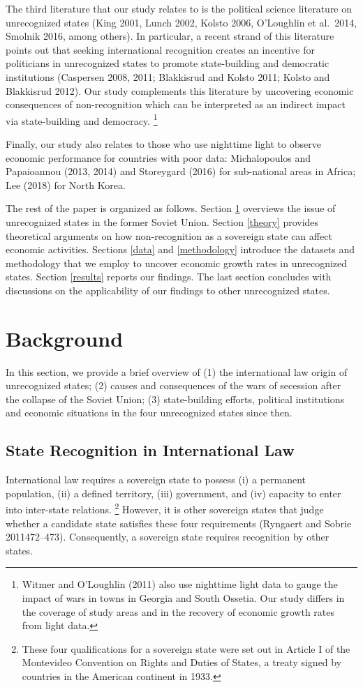\documentclass[12pt,a4paper]{article}%
\begin{document}
The third literature that our study relates to is the political science literature on unrecognized states (King 2001, Lunch 2002, Kolsto 2006, O'Loughlin et al.\ 2014, Smolnik 2016, among others). 
In particular, a recent strand of this literature points out that seeking international recognition creates an incentive for politicians in unrecognized states to promote state-building and democratic institutions (Caspersen 2008, 2011; Blakkisrud and Kolsto 2011; Kolsto and Blakkisrud 2012).
Our study complements this literature by uncovering economic consequences of non-recognition which can be interpreted as an indirect impact via state-building and democracy.%
\footnote{
	Witmer and O'Loughlin (2011) also use nighttime light data to gauge the impact of wars in towns in Georgia and South Ossetia. Our study differs in the coverage of study areas and in the recovery of economic growth rates from light data. 
} 

Finally, our study also relates to those who use nighttime light to observe economic performance for countries with poor data: Michalopoulos and Papaioannou (2013, 2014) and Storeygard (2016) for sub-national areas in Africa; Lee (2018) for North Korea. 

The rest of the paper is organized as follows. Section \ref{background} overviews the issue of unrecognized states in the former Soviet Union. Section \ref{theory} provides theoretical arguments on how non-recognition as a sovereign state can affect economic activities. Sections \ref{data} and \ref{methodology} introduce the datasets and methodology that we employ to uncover economic growth rates in unrecognized states. Section \ref{results} reports our findings. The last section concludes with discussions on the applicability of our findings to other unrecognized states.

\section{Background}\label{background}
In this section, we provide a brief overview of (1) the international law origin of unrecognized states; (2) causes and consequences of the wars of secession after the collapse of the Soviet Union; (3) state-building efforts, political institutions and economic situations in the four unrecognized states since then.
\subsection{State Recognition in International Law}\label{intl_law}
International law requires a sovereign state to possess (i) a permanent population, (ii) a defined territory, (iii) government, and (iv) capacity to enter into inter-state relations.%
\footnote{
	These four qualifications for a sovereign state were set out in Article I of the Montevideo Convention on Rights and Duties of States, a treaty signed by countries in the American continent in 1933.
	}
However, it is other sovereign states that judge whether a candidate state satisfies these four requirements (Ryngaert and Sobrie 2011472--473).
Consequently, a sovereign state requires recognition by other states.
\end{document}
